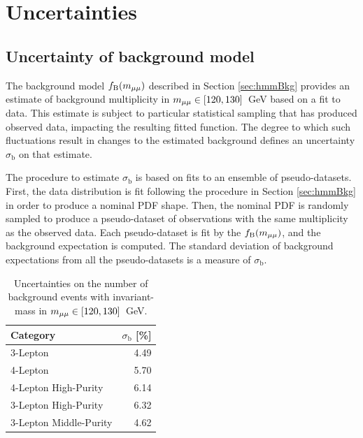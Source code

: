 \section{Uncertainties}\label{sec:hmmSyst}

\subsection{Uncertainty of background model}\label{sec:hmmBkgUncert}

The background model $f_\text{B}(m_{\mu\mu})$ described in Section \ref{sec:hmmBkg} provides an estimate of background multiplicity in $m_{\mu\mu}\in[120,130]$~GeV based on a fit to data.
This estimate is subject to particular statistical sampling that has produced observed data, impacting the resulting fitted function.
The degree to which such fluctuations result in changes to the estimated background defines an uncertainty $\sigma_\text{b}$ on that estimate.

The procedure to estimate $\sigma_\text{b}$ is based on fits to an ensemble of pseudo-datasets.
First, the data distribution is fit following the procedure in Section \ref{sec:hmmBkg} in order to produce a nominal PDF shape.
Then, the nominal PDF is randomly sampled to produce a pseudo-dataset of observations with the same multiplicity as the observed data.
Each pseudo-dataset is fit by the $f_\text{B}(m_{\mu\mu})$, and the background expectation is computed.
The standard deviation of background expectations from all the pseudo-datasets is a measure of $\sigma_\text{b}$.

\begin{table}[htp]
\caption{Uncertainties on the number of background events with invariant-mass in $m_{\mu\mu}\in[120,130]$~GeV.}
\begin{center}
\begin{tabular}{l r}
\toprule
Category & $\sigma_\text{b}$ [\%] \\
\midrule
    3-Lepton               &  4.49 \\
    4-Lepton               &  5.70 \\
\midrule
    4-Lepton High-Purity   &  6.14 \\
    3-Lepton High-Purity   &  6.32 \\
    3-Lepton Middle-Purity &  4.62 \\
\bottomrule
\end{tabular}
\label{tab:hmmSigmsB}
\end{center}
\end{table}

